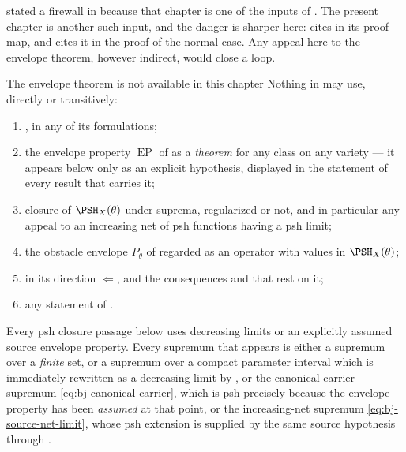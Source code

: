  stated a firewall in
 because that chapter is one of the inputs of
.  The present chapter is another such input,
and the danger is sharper here:  cites
 in its proof map, and
 cites it in the proof of the normal case.  Any
appeal here to the envelope theorem, however indirect, would close a loop.

\begin{warning}{The envelope theorem is not available in this chapter}
\label{warn:ch39-firewall}
Nothing in  may use, directly or transitively:
\begin{enumerate}
\item {}, in any of its formulations;
\item the envelope property $\operatorname{EP}$ of
  as a \emph{theorem} for any class on any
 variety --- it appears below only as an explicit hypothesis, displayed in
 the statement of every result that carries it;
\item closure of $\PSH_X(\theta)$ under suprema, regularized or not, and
 in particular any appeal to an increasing net of psh functions having a
 psh limit;
\item the obstacle envelope $P_\theta$ of
  regarded as an operator with values in
 $\PSH_X(\theta)$;
\item {} in its direction
 $\Leftarrow$, and the consequences
  and
  that rest on it;
\item any statement of .
\end{enumerate}
Every psh closure passage below uses decreasing limits or an explicitly
assumed source envelope property.  Every supremum that
appears is either a supremum over a \emph{finite} set, or a supremum over a
compact parameter interval which is immediately rewritten as a decreasing
limit by , or the canonical-carrier
supremum \eqref{eq:bj-canonical-carrier}, which is psh precisely because the
envelope property has been \emph{assumed} at that point, or the
increasing-net supremum \eqref{eq:bj-source-net-limit}, whose psh extension
is supplied by the same source hypothesis through
.
\end{warning}

